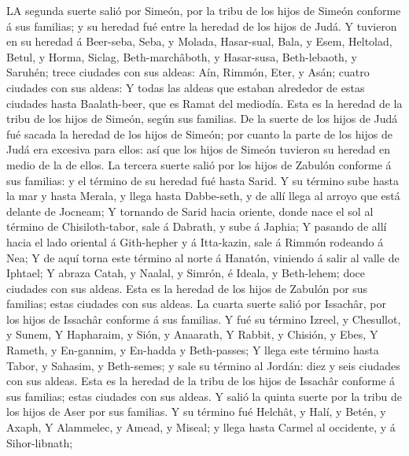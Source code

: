  LA segunda suerte salió por Simeón, por la tribu de los
hijos de Simeón conforme á sus familias; y su heredad fué entre la
heredad de los hijos de Judá.  Y tuvieron en su heredad á
Beer-seba, Seba, y Molada,  Hasar-sual, Bala, y Esem,
 Heltolad, Betul, y Horma,  Siclag,
Beth-marchâboth, y Hasar-susa,  Beth-lebaoth, y Saruhén;
trece ciudades con sus aldeas:  Aín, Rimmón, Eter, y Asán;
cuatro ciudades con sus aldeas:  Y todas las aldeas que
estaban alrededor de estas ciudades hasta Baalath-beer, que es Ramat del
mediodía. Esta es la heredad de la tribu de los hijos de Simeón, según
sus familias.  De la suerte de los hijos de Judá fué
sacada la heredad de los hijos de Simeón; por cuanto la parte de los
hijos de Judá era excesiva para ellos: así que los hijos de Simeón
tuvieron su heredad en medio de la de ellos.  La tercera
suerte salió por los hijos de Zabulón conforme á sus familias: y el
término de su heredad fué hasta Sarid.  Y su término sube
hasta la mar y hasta Merala, y llega hasta Dabbe-seth, y de allí llega
al arroyo que está delante de Jocneam;  Y tornando de
Sarid hacia oriente, donde nace el sol al término de Chisiloth-tabor,
sale á Dabrath, y sube á Japhia;  Y pasando de allí hacia
el lado oriental á Gith-hepher y á Itta-kazin, sale á Rimmón rodeando á
Nea;  Y de aquí torna este término al norte á Hanatón,
viniendo á salir al valle de Iphtael;  Y abraza Catah, y
Naalal, y Simrón, é Ideala, y Beth-lehem; doce ciudades con sus aldeas.
 Esta es la heredad de los hijos de Zabulón por sus
familias; estas ciudades con sus aldeas.  La cuarta
suerte salió por Issachâr, por los hijos de Issachâr conforme á sus
familias.  Y fué su término Izreel, y Chesullot, y Sunem,
 Y Hapharaim, y Sión, y Anaarath,  Y
Rabbit, y Chisión, y Ebes,  Y Rameth, y En-gannim, y
En-hadda y Beth-passes;  Y llega este término hasta
Tabor, y Sahasim, y Beth-semes; y sale su término al Jordán: diez y seis
ciudades con sus aldeas.  Esta es la heredad de la tribu
de los hijos de Issachâr conforme á sus familias; estas ciudades con sus
aldeas.  Y salió la quinta suerte por la tribu de los
hijos de Aser por sus familias.  Y su término fué
Helchât, y Halí, y Betén, y Axaph,  Y Alammelec, y Amead,
y Miseal; y llega hasta Carmel al occidente, y á Sihor-libnath;
